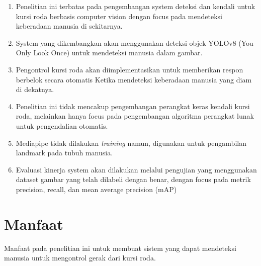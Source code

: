 \begin{enumerate}[nolistsep]

  \item Penelitian ini terbatas pada pengembangan system deteksi dan kendali untuk kursi roda berbasis computer vision dengan focus pada mendeteksi keberadaan manusia di sekitarnya.

  \item System yang dikembangkan akan menggunakan deteksi objek YOLOv8 (You Only Look Once) untuk mendeteksi manusia dalam gambar.

  \item Pengontrol kursi roda akan diimplementasikan untuk memberikan respon berbelok secara otomatis Ketika mendeteksi keberadaan manusia yang diam di dekatnya.
  
  \item Penelitian ini tidak mencakup pengembangan perangkat keras kendali kursi roda, melainkan hanya focus pada pengembangan algoritma perangkat lunak untuk pengendalian otomatis.
  
  \item Mediapipe tidak dilakukan \emph{training} namun, digunakan untuk pengambilan landmark pada tubuh manusia.

  \item Evaluasi kinerja system akan dilakukan melalui pengujian yang menggunakan dataset gambar yang telah dilabeli dengan benar, dengan focus pada metrik precision, recall, dan mean average precision (mAP)

\end{enumerate}

\section{Manfaat}

Manfaat pada penelitian ini untuk membuat sistem yang dapat mendeteksi manusia untuk mengontrol gerak dari kursi roda.
